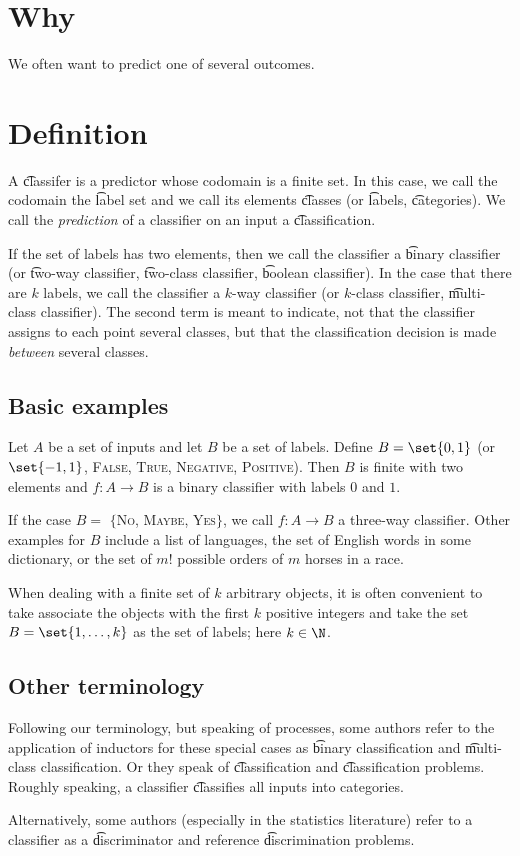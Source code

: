 
\section*{Why}

We often want to predict one of several outcomes.

\section*{Definition}

A \t{classifer} is a predictor whose codomain is a finite set.
In this case, we call the codomain the \t{label set} and we call its elements \t{classes} (or \t{labels}, \t{categories}).
We call the \textit{prediction} of a classifier on an input a \t{classification}.

If the set of labels has two elements, then we call the classifier a \t{binary classifier} (or \t{two-way classifier}, \t{two-class classifier}, \t{boolean classifier}).
In the case that there are $k$ labels, we call the classifier a \t{$k$-way classifier} (or \t{$k$-class classifier}, \t{multi-class classifier}).
The second term is meant to indicate, not that the classifier assigns to each point several classes, but that the classification decision is made \textit{between} several classes.

\subsection*{Basic examples}

Let $A$ be a set of inputs and let $B$ be a set of labels.
Define $B = \set{0, 1}$ (or $\set{-1,1}$, {\textsc{False}, \textsc{True}}, {\textsc{Negative}, \textsc{Positive}}).
Then $B$ is finite with two elements and $f: A \to B$ is a binary classifier with labels $0$ and $1$.

If the case $B = $ $\{$\textsc{No}, \textsc{Maybe}, \textsc{Yes}$\}$, we call $f: A \to B$ a three-way classifier.
Other examples for $B$ include a list of languages, the set of English words in some dictionary, or the set of $m!$ possible orders of $m$ horses in a race.

When dealing with a finite set of $k$ arbitrary objects, it is often convenient to take associate the objects with the first $k$ positive integers and take the set $B = \set{1, \dots , k}$ as the set of labels; here $k \in \N  $.

\subsection*{Other terminology}

Following our terminology, but speaking of processes, some authors refer to the application of inductors for these special cases as \t{binary classification} and \t{multi-class classification}.
Or they speak of \t{classification} and \t{classification problems}.
Roughly speaking, a classifier \t{classifies} all inputs into categories.

Alternatively, some authors (especially in the statistics literature) refer to a classifier as a \t{discriminator} and reference \t{discrimination problems}.
